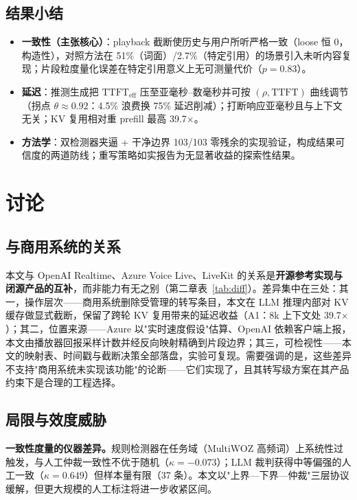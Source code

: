 \documentclass[conference]{IEEEtran}
\theoremstyle{definition}
\begin{document}
\subsection{结果小结}
\begin{itemize}
  \item \textbf{一致性（主张核心）}：playback 截断使历史与用户所听严格一致（loose 恒 0，构造性），对照方法在 51\%（词面）/2.7\%（特定引用）的场景引入未听内容复现；片段粒度量化误差在特定引用意义上无可测量代价（$p=0.83$）。
  \item \textbf{延迟}：推测生成把 $\mathrm{TTFT}_{\text{eff}}$ 压至亚毫秒–数毫秒并可按 $(\rho, \mathrm{TTFT})$ 曲线调节（拐点 $\theta\approx0.92$：4.5\% 浪费换 75\% 延迟削减）；打断响应亚毫秒且与上下文无关；KV 复用相对重 prefill 最高 39.7$\times$。
  \item \textbf{方法学}：双检测器夹逼 + 干净边界 103/103 零残余的实现验证，构成结果可信度的两道防线；重写策略如实报告为无显著收益的探索性结果。
\end{itemize}

\section{讨论}\label{sec:discussion}

\subsection{与商用系统的关系}
本文与 OpenAI Realtime、Azure Voice Live、LiveKit 的关系是\textbf{开源参考实现与闭源产品的互补}，而非能力有无之别（第二章表~\ref{tab:diff}）。差异集中在三处：其一，操作层次——商用系统删除受管理的转写条目，本文在 LLM 推理内部对 KV 缓存做显式截断，保留了跨轮 KV 复用带来的延迟收益（A1：8k 上下文处 39.7$\times$）；其二，位置来源——Azure 以"实时速度假设"估算、OpenAI 依赖客户端上报，本文由播放器回报采样计数并经反向映射精确到片段边界；其三，可检视性——本文的映射表、时间戳与截断决策全部落盘，实验可复现。需要强调的是，这些差异不支持"商用系统未实现该功能"的论断——它们实现了，且其转写级方案在其产品约束下是合理的工程选择。

\subsection{局限与效度威胁}
\textbf{一致性度量的仪器差异。}规则检测器在任务域（MultiWOZ 高频词）上系统性过触发，与人工仲裁一致性不优于随机（$\kappa=-0.073$）；LLM 裁判获得中等偏强的人工一致（$\kappa=0.649$）但样本量有限（37 条）。本文以"上界—下界—仲裁"三层协议缓解，但更大规模的人工标注将进一步收紧区间。
\end{document}
